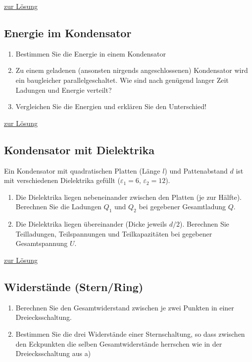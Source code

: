 \documentclass[a4paper]{scrartcl}
\begin{document}
\hyperref[lsg:ElektronEB]{zur Lösung}

\subsection{Energie im Kondensator}
\label{aufg:EnergieKonsensator}
\begin{enumerate}[noitemsep]
  \item Bestimmen Sie die Energie in einem Kondensator
  \item Zu einem geladenen (ansonsten nirgends angeschlossenen) Kondensator wird ein baugleicher parallelgeschaltet. Wie sind nach genügend langer Zeit Ladungen und Energie verteilt?
  \item Vergleichen Sie die Energien und erklären Sie den Unterschied!
\end{enumerate}

\hyperref[lsg:EnergieKondensator]{zur Lösung}

\subsection{Kondensator mit Dielektrika}
\label{aufg:KondensatorDielektrika}
Ein Kondensator mit quadratischen Platten (Länge $l$) und Pattenabstand $d$ ist mit verschiedenen Dielektrika gefüllt ($\varepsilon_1 = 6$, $\varepsilon_2 = 12$).
\begin{enumerate}[noitemsep]
  \item Die Dielektrika liegen nebeneinander zwischen den Platten (je zur Hälfte). Berechnen Sie die Ladungen $Q_1$ und $Q_2$ bei gegebener Gesamtladung $Q$.
  \item Die Dielektrika liegen übereinander (Dicke jeweils $d/2$). Berechnen Sie Teilladungen, Teilspannungen und Teilkapazitäten bei gegebener Gesamtspannung $U$.
\end{enumerate}

\hyperref[lsg:KondensatorDielektrika]{zur Lösung}

\subsection{Widerstände (Stern/Ring)}
\label{aufg:Widerstaende}
\begin{enumerate}[noitemsep]
  \item Berechnen Sie den Gesamtwiderstand zwischen je zwei Punkten in einer Dreiecksschaltung.
  \item Bestimmen Sie die drei Widerstände einer Sternschaltung, so dass zwischen den Eckpunkten die selben Gesamtwiderstände herrschen wie in der Dreiecksschaltung aus a)
\end{enumerate}
\end{document}
